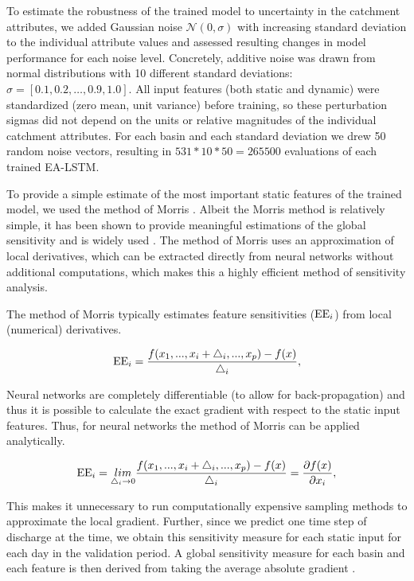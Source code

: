 To estimate the robustness of the trained model to uncertainty in the catchment attributes, we added Gaussian noise $\mathcal{N}(0,\sigma)$ with increasing standard deviation to the individual attribute values and assessed resulting changes in model performance for each noise level. Concretely, additive noise was drawn from normal distributions with 10 different standard deviations: $\sigma = [0.1, 0.2, … , 0.9, 1.0]$. All input features (both static and dynamic) were standardized (zero mean, unit variance) before training, so these perturbation sigmas did not depend on the units or relative magnitudes of the individual catchment attributes. For each basin and each standard deviation we drew 50 random noise vectors, resulting in $531*10*50=265 500$ evaluations of each trained \gls{EA-LSTM}.

To provide a simple estimate of the most important static features of the trained model, we used the method of Morris \citep{morris1991factorial}. Albeit the Morris method is relatively simple, it has been shown to provide meaningful estimations of the global sensitivity and is widely used \citep[e.g.,][]{Herman2013technical, wang2019practical}. The method of Morris uses an approximation of local derivatives, which can be extracted directly from neural networks without additional computations, which makes this a highly efficient method of sensitivity analysis. 

The method of Morris typically estimates feature sensitivities ($\textup{EE}_i$) from local (numerical) derivatives.

\begin{equation}
    \textup{EE}_i = \frac{f(x_1,...,x_i + \triangle_i,...,x_p) - f(x)}{\triangle_i},
\end{equation}

Neural networks are completely differentiable (to allow for back-propagation) and thus it is possible to calculate the exact gradient with respect to the static input features. Thus, for neural networks the method of Morris can be applied analytically.

\begin{equation}
    \textup{EE}_i = \underset{\triangle_i\rightarrow 0}{lim} \frac{f(x_1,...,x_i + \triangle_i,...,x_p) - f(x)}{\triangle_i} = \frac{\partial f(x)}{\partial x_i},
\end{equation}

This makes it unnecessary to run computationally expensive sampling methods to approximate the local gradient. Further, since we predict one time step of discharge at the time, we obtain this sensitivity measure for each static input for each day in the validation period. A global sensitivity measure for each basin and each feature is then derived from taking the average absolute gradient \citep{saltelli2004sensitivity}.

